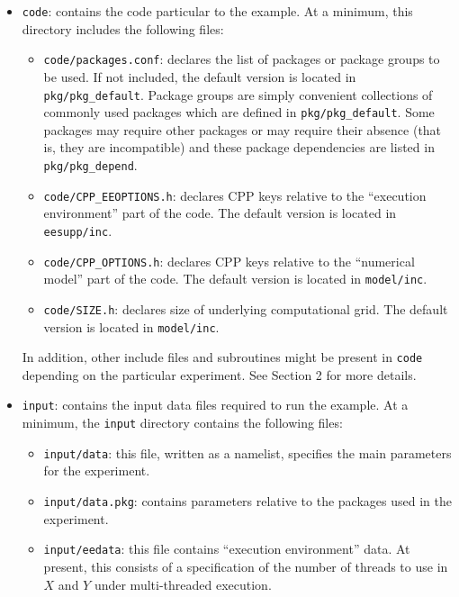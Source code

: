 \begin{itemize}
\item \texttt{code}: contains the code particular to the example. At a
  minimum, this directory includes the following files:

  \begin{itemize}
  \item \texttt{code/packages.conf}: declares the list of packages or
    package groups to be used.  If not included, the default version
    is located in \texttt{pkg/pkg\_default}.  Package groups are
    simply convenient collections of commonly used packages which are
    defined in \texttt{pkg/pkg\_default}.  Some packages may require
    other packages or may require their absence (that is, they are
    incompatible) and these package dependencies are listed in
    \texttt{pkg/pkg\_depend}.

  \item \texttt{code/CPP\_EEOPTIONS.h}: declares CPP keys relative to
    the ``execution environment'' part of the code. The default
    version is located in \texttt{eesupp/inc}.

  \item \texttt{code/CPP\_OPTIONS.h}: declares CPP keys relative to
    the ``numerical model'' part of the code. The default version is
    located in \texttt{model/inc}.

  \item \texttt{code/SIZE.h}: declares size of underlying
    computational grid.  The default version is located in
    \texttt{model/inc}.
  \end{itemize}

  In addition, other include files and subroutines might be present in
  \texttt{code} depending on the particular experiment. See Section 2
  for more details.

\item \texttt{input}: contains the input data files required to run
  the example. At a minimum, the \texttt{input} directory contains the
  following files:

  \begin{itemize}
  \item \texttt{input/data}: this file, written as a namelist,
    specifies the main parameters for the experiment.

  \item \texttt{input/data.pkg}: contains parameters relative to the
    packages used in the experiment.

  \item \texttt{input/eedata}: this file contains ``execution
    environment'' data. At present, this consists of a specification
    of the number of threads to use in $X$ and $Y$ under multi-threaded
    execution.
  \end{itemize}


\end{itemize}

